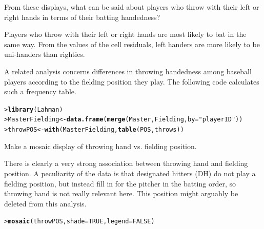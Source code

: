\documentclass[10pt]{report}\usepackage[]{graphicx}\usepackage[]{color}
\makeatletter
\newcommand{\hlnum}[1]{\textcolor[rgb]{0.686,0.059,0.569}{#1}}%
\newcommand{\hlstr}[1]{\textcolor[rgb]{0.192,0.494,0.8}{#1}}%
\newcommand{\hlstd}[1]{\textcolor[rgb]{0.345,0.345,0.345}{#1}}%
\newcommand{\hlkwb}[1]{\textcolor[rgb]{0.69,0.353,0.396}{#1}}%
\newcommand{\hlkwc}[1]{\textcolor[rgb]{0.333,0.667,0.333}{#1}}%
\newcommand{\hlkwd}[1]{\textcolor[rgb]{0.737,0.353,0.396}{\textbf{#1}}}%
\newenvironment{kframe}{%
 \def\at@end@of@kframe{}%
 \ifinner\ifhmode%
  \def\at@end@of@kframe{\end{minipage}}%
  \begin{minipage}{\columnwidth}%
 \fi\fi%
 \def\FrameCommand##1{\hskip\@totalleftmargin \hskip-\fboxsep
 \colorbox{shadecolor}{##1}\hskip-\fboxsep
     \hskip-\linewidth \hskip-\@totalleftmargin \hskip\columnwidth}%
 \MakeFramed {\advance\hsize-\width
   \@totalleftmargin\z@ \linewidth\hsize
   \@setminipage}}%
 {\par\unskip\endMakeFramed%
 \at@end@of@kframe}
\newenvironment{knitrout}{}{} %
\renewenvironment{knitrout}{\small\renewcommand{\baselinestretch}{.85}}{} %
\makeatother
\begin{document}
\begin{Exercises}
\begin{itemize*}
    \item From these displays, what can be said about players who throw with their left
    or right hands in terms of their batting handedness?
    \begin{ans}
    Players who throw with their left or right hands are most likely to bat in the same way.
    From the values of the cell residuals, left handers are more likely to be uni-handers than
    righties.
    \end{ans}
    
  \end{itemize*}

\exercise\hard A related analysis concerns differences in throwing handedness among baseball players
according to the fielding position they play.  The following code calculates
such a frequency table.

\begin{knitrout}\footnotesize
{}\color{fgcolor}\begin{kframe}
\begin{alltt}
\hlstd{> }\hlkwd{library}\hlstd{(Lahman)}
\hlstd{> }\hlstd{MasterFielding} \hlkwb{<-} \hlkwd{data.frame}\hlstd{(}\hlkwd{merge}\hlstd{(Master, Fielding,} \hlkwc{by} \hlstd{=} \hlstr{"playerID"}\hlstd{))}
\hlstd{> }\hlstd{throwPOS} \hlkwb{<-} \hlkwd{with}\hlstd{(MasterFielding,} \hlkwd{table}\hlstd{(POS, throws))}
\end{alltt}
\end{kframe}
\end{knitrout}
  \begin{enumerate*}
    \item Make a mosaic display of throwing hand vs. fielding position.
    \begin{ans}
    There is clearly a very strong association between throwing hand and fielding position.
    A peculiarity of the data is that designated hitters (DH) do not 
    play a fielding position, but instead fill in for the pitcher in the batting order, so throwing
    hand is not really relevant here.  This position might arguably be deleted from this analysis.
\begin{knitrout}\footnotesize
{}\color{fgcolor}\begin{kframe}
\begin{alltt}
\hlstd{> }\hlkwd{mosaic}\hlstd{(throwPOS,} \hlkwc{shade}\hlstd{=}\hlnum{TRUE}\hlstd{,} \hlkwc{legend}\hlstd{=}\hlnum{FALSE}\hlstd{)}
\end{alltt}
\end{kframe}


\end{knitrout}
\end{ans}
\end{enumerate*}
\end{Exercises}
\end{document}
